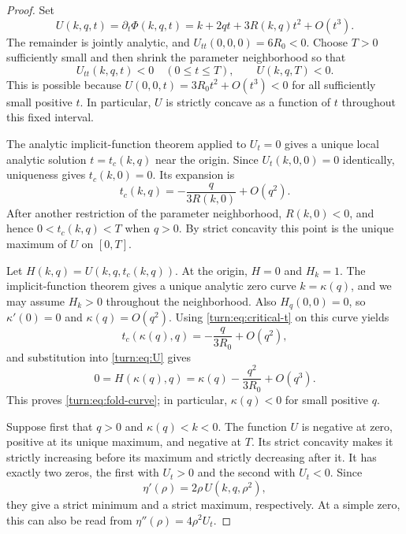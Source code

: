 \begin{proof}
Set
\begin{equation}
 U(k,q,t)=\partial_t\Phi(k,q,t)
       =k+2qt+3R(k,q)t^2+O(t^3).
 \label{turn:eq:U}
\end{equation}
The remainder is jointly analytic, and
$U_{tt}(0,0,0)=6R_0<0$.  Choose $T>0$ sufficiently small and then
shrink the parameter neighborhood so that
\begin{equation}
 U_{tt}(k,q,t)<0\quad(0\le t\le T),
 \qquad U(k,q,T)<0.
 \label{turn:eq:concavity}
\end{equation}
This is possible because
$U(0,0,t)=3R_0t^2+O(t^3)<0$ for all sufficiently small positive $t$.
In particular, $U$ is strictly concave as a function of $t$ throughout
this fixed interval.

The analytic implicit-function theorem applied to $U_t=0$ gives a
unique local analytic solution $t=t_c(k,q)$ near the origin.  Since
$U_t(k,0,0)=0$ identically, uniqueness gives $t_c(k,0)=0$.  Its expansion
is
\begin{equation}
 t_c(k,q)=-\frac{q}{3R(k,0)}+O(q^2).
 \label{turn:eq:critical-t}
\end{equation}
After another restriction of the parameter neighborhood, $R(k,0)<0$,
and hence $0<t_c(k,q)<T$ when $q>0$.  By strict concavity this point is
the unique maximum of $U$ on $[0,T]$.

Let $H(k,q)=U(k,q,t_c(k,q))$.  At the origin, $H=0$ and $H_k=1$.
The implicit-function theorem gives a unique analytic zero curve
$k=\kappa(q)$, and we may assume $H_k>0$ throughout the neighborhood.
Also $H_q(0,0)=0$, so $\kappa'(0)=0$ and $\kappa(q)=O(q^2)$.
Using \eqref{turn:eq:critical-t} on this curve yields
\[
 t_c(\kappa(q),q)=-\frac{q}{3R_0}+O(q^2),
\]
and substitution into \eqref{turn:eq:U} gives
\[
 0=H(\kappa(q),q)
  =\kappa(q)-\frac{q^2}{3R_0}+O(q^3).
\]
This proves \eqref{turn:eq:fold-curve}; in particular, $\kappa(q)<0$
for small positive $q$.

Suppose first that $q>0$ and $\kappa(q)<k<0$.  The function $U$ is
negative at zero, positive at its unique maximum, and negative at
$T$.  Its strict concavity makes it strictly increasing before its
maximum and strictly decreasing after it.  It has exactly two zeros,
the first with $U_t>0$ and the second with $U_t<0$.  Since
\begin{equation}
 \eta'(\rho)=2\rho\,U(k,q,\rho^2),
 \label{turn:eq:derivative-eta}
\end{equation}
they give a strict minimum and a strict maximum, respectively.
At a simple zero, this can also be read from
$\eta''(\rho)=4\rho^2U_t$.


\end{proof}
